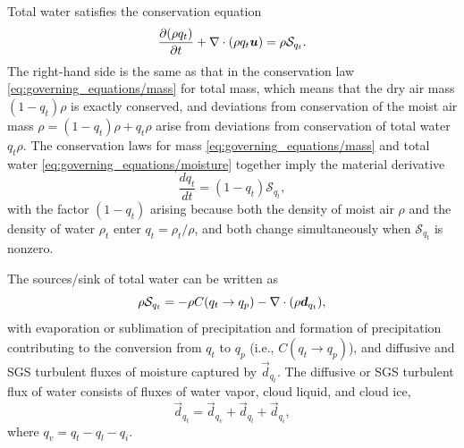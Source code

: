 \documentclass{article}
\begin{document}
Total water satisfies the conservation equation
\begin{equation}
\frac{\partial (\rho q_t)}{\partial t} + \nabla \cdot (\rho q_t \boldsymbol{{u}}) = \rho \mathcal{S}_{q_t}.   
\label{eq:governing_equations/moisture}
\end{equation}
The right-hand side is the same as that in the conservation law \eqref{eq:governing_equations/mass} for total mass, which means that the dry air mass $(1-q_t)\rho$ is exactly conserved, and deviations from conservation of the moist air mass $\rho = (1-q_t)\rho + q_t \rho$ arise from deviations from conservation of total water $q_t\rho$. The conservation laws for mass \eqref{eq:governing_equations/mass} and total water \eqref{eq:governing_equations/moisture} together imply the material derivative 
\[
\frac{dq_t}{dt} = (1-q_t) \mathcal{S}_{q_t},
\]
with the factor $(1-q_t)$ arising because both the density of moist air $\rho$ and the density of water $\rho_t$ enter $q_t = \rho_t/\rho$, and both change simultaneously when $\mathcal{S}_{q_t}$ is nonzero.

The sources/sink of total water can be written as  
\begin{equation}\label{e:water_sources}
     \rho \mathcal{S}_{q_t} = - \rho C(q_t \rightarrow q_p) - \nabla \cdot (\rho \boldsymbol{{d}}_{q_t}),
\end{equation}
with evaporation or sublimation of precipitation and formation of precipitation contributing to the conversion from $q_t$ to $q_p$ (i.e., $C(q_t \rightarrow q_p)$), and diffusive and SGS turbulent fluxes of moisture captured by $\vec{d}_{q_t}$. The diffusive or SGS turbulent flux of water consists of fluxes of water vapor, cloud liquid, and cloud ice, \begin{equation}
    \vec{d}_{q_t} =\vec{d}_{q_v} + \vec{d}_{q_l} + \vec{d}_{q_i},
\end{equation}
where $q_v = q_t - q_l - q_i$.
\end{document}
